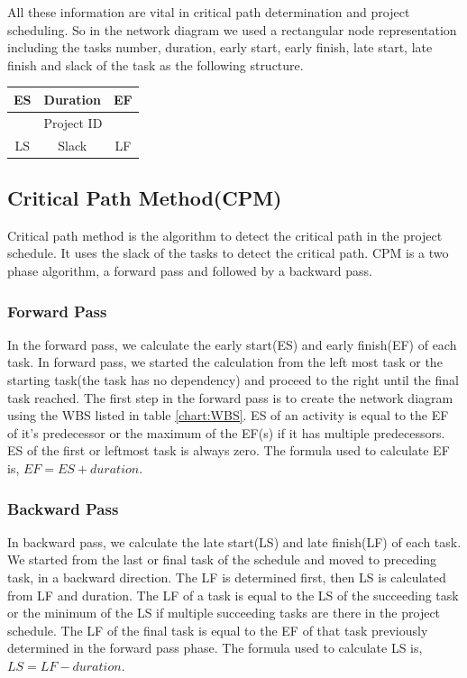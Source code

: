 \begin{spacing}{1}
 All these information are vital in critical path determination and project scheduling. So in the network diagram we used a rectangular node representation including the tasks number, duration, early start, early finish, late start, late finish and slack of the task as the following structure.
 
 \begin{center}
\begin{tabular}{|c|c|c|}
	\hline
	ES & Duration & EF \\
	\hline
	\multicolumn{3}{|c|}{Project ID} \\
	\hline
	LS & Slack & LF \\
	\hline
\end{tabular}
\end{center}

\subsection{Critical Path Method(CPM)}
Critical path method is the algorithm to detect the critical path in the project schedule. It uses the slack of the tasks to detect the critical path. CPM is a two phase algorithm, a forward pass and followed by a backward pass.

\subsubsection{Forward Pass} 
In the forward pass, we calculate the early start(ES) and early finish(EF) of each task. In forward pass, we started the calculation from the left most task or the starting task(the task has no dependency) and proceed to the right until the final task reached. The first step in the forward pass is to create the network diagram using the WBS listed in table \ref{chart:WBS}. ES of an activity is equal to the EF of it's predecessor or the maximum of the EF(s) if it has multiple predecessors. ES of the first or leftmost task is always zero. The formula used to calculate EF is, $EF = ES + duration.$

\subsubsection{Backward Pass}
In backward pass, we calculate the late start(LS) and late finish(LF)  of each task. We started from the last or final task of the schedule and moved to preceding task, in a backward direction. The LF is determined first, then LS is calculated from LF and duration. The LF of a task is equal to the LS of the succeeding task or the minimum of the LS if multiple succeeding  tasks are there in the project schedule. The LF of the final task is equal to the EF of that task previously determined in the forward pass phase. The formula used to calculate LS is, $LS = LF - duration.$


\end{spacing}
